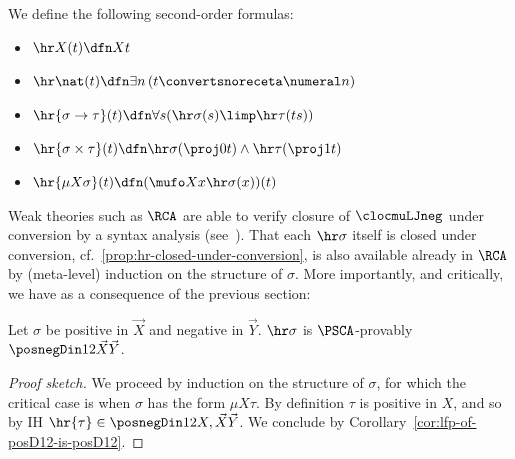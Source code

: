 \begin{definition}
We define the following second-order formulas:
\begin{itemize}
    \item $\hr X (t) \dfn Xt$
    \item $\hr \nat (t) \dfn  \exists n\,  (t \convertsnoreceta \numeral n) $ 
    \item $\hr {\sigma \to \tau} (t) \dfn \forall s ( \hr\sigma (s) \limp \hr \tau (ts))$
    \item $\hr{\sigma \times \tau} (t) \dfn \hr \sigma (\proj 0 t) \land \hr \tau (\proj 1 t) $
    \item  $\hr {\mu X \sigma} (t) \dfn (\mufo X x {\hr \sigma (x)}) (t)$
\end{itemize}
\end{definition}

Weak theories such as $\RCA$ are able to verify closure of $\clocmuLJneg$ under conversion by a syntax analysis (see~\cite{Das21:CT-fscd}).
That each $\hr\sigma$ itself is closed under conversion, cf.~\ref{prop:hr-closed-under-conversion}, is also available already in $\RCA$ by (meta-level) induction on the structure of $\sigma$.
More importantly, and critically, we have as a consequence of the previous section:

\begin{corollary}
    \label{cor:hr-is-D12}
    Let $\sigma$ be positive in $\vec X$ and negative in $\vec Y$.
    $\hr \sigma$ is $\PSCA$-provably $\posnegDin 1 2 {\vec X}{\vec Y}$. 
\end{corollary}
\begin{proof}[Proof sketch]
    We proceed by induction on the structure of $\sigma$, for which the critical case is when $\sigma$ has the form $\mu X \tau$.
    By definition $\tau$ is positive in $X$, and so by IH $\hr{\tau} \in \posnegDin 1 2 {X,\vec X}{\vec Y}$.
    We conclude by Corollary~\ref{cor:lfp-of-posD12-is-posD12}.
\end{proof}


